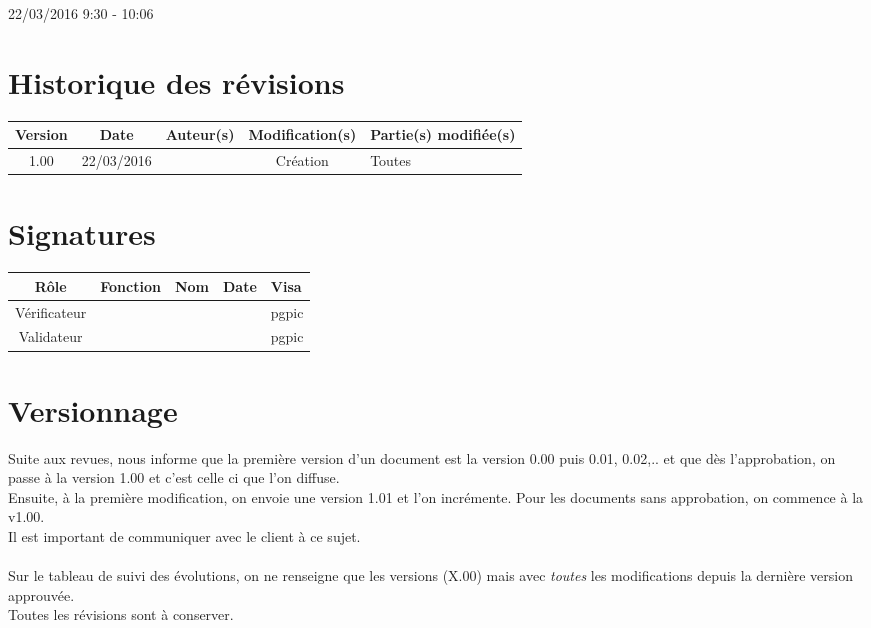 \documentclass [a4paper] {article}
\begin{document}
\rhead{}

22/03/2016
\hfill   
\hfill 	9:30 - 10:06 				%



\section*{Historique des révisions}
\begin{center}
			\begin{tabular}{| c | c | c | c | p{4cm} |}
				\hline
				\rowcolor{Gray}
				Version & Date & Auteur(s) & Modification(s) & Partie(s) modifiée(s)		 \\
				\hline
				1.00 & 22/03/2016 & \Pierre & Création & Toutes \\
		\hline		
			\end{tabular}
		\end{center}

\section*{Signatures}

		\begin{center}
			\begin{tabular}{| c | c | c | c | p{4cm} |}
				\hline
				\rowcolor{Gray}
				Rôle & Fonction & Nom & Date & Visa		 \\
				\hline
				Vérificateur & \RQA & \Kafui &  & pgpic \\[30pt]
				\hline
				Validateur & \CP & \Sergi &  & pgpic \\[30pt]	
				\hline
			\end{tabular}
		\end{center}


\section{Versionnage}
Suite aux revues, \nomTuteurQualite{} nous informe que la première version d'un document est la version 0.00 puis 0.01, 0.02,.. et que dès l'approbation, on passe à la version 1.00 et c'est celle ci que l'on diffuse. \\
Ensuite, à la première modification, on envoie une version 1.01 et l'on incrémente. Pour les documents sans approbation, on commence à la v1.00. \\
Il est important de communiquer avec le client à ce sujet. \\ ~ \\
Sur le tableau de suivi des évolutions, on ne renseigne que les versions (X.00) mais avec \emph{toutes} les modifications depuis la dernière version approuvée.\\
Toutes les révisions sont à conserver.
\end{document}
